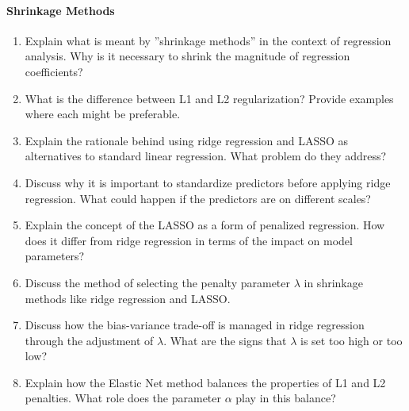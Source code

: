 \paragraph*{Shrinkage Methods}
\begin{enumerate}
  \item Explain what is meant by ''shrinkage methods'' in the context of regression analysis. Why is it necessary to shrink the magnitude of regression coefficients?
  \item What is the difference between L1 and L2 regularization? Provide examples where each might be preferable.
  \item Explain the rationale behind using ridge regression and LASSO as alternatives to standard linear regression. What problem do they address?
  \item Discuss why it is important to standardize predictors before applying ridge regression. What could happen if the predictors are on different scales?
  \item Explain the concept of the LASSO as a form of penalized regression. How does it differ from ridge regression in terms of the impact on model parameters?
  \item Discuss the method of selecting the penalty parameter $\lambda$ in shrinkage methods like ridge regression and LASSO.
  \item Discuss how the bias-variance trade-off is managed in ridge regression through the adjustment of $\lambda$. What are the signs that $\lambda$ is set too high or too low?
  \item Explain how the Elastic Net method balances the properties of L1 and L2 penalties. What role does the parameter $\alpha$ play in this balance?
\end{enumerate}
